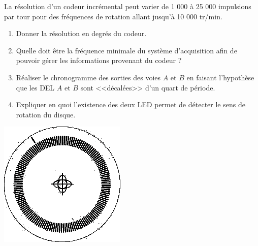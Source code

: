 \documentclass[10pt,fleqn]{article} %
\begin{document}
\begin{exemple}
\begin{minipage}[c]{.75\linewidth}

La résolution d'un codeur incrémental peut varier de 1 000 à 25 000 impulsions par tour pour des fréquences de rotation allant jusqu'à 10 000 tr/min.
\begin{enumerate}
\item Donner la résolution en degrés du codeur. 
\item Quelle doit être la fréquence minimale du système d'acquisition afin de pouvoir gérer les informations provenant du codeur ?
\item Réaliser le chronogramme des sorties des voies $A$ et $B$ en faisant l'hypothèse que les DEL $A$ et $B$ sont <<décalées>> d'un quart de période.
\item Expliquer en quoi l'existence des deux LED permet de détecter le sens de rotation du disque. 
\end{enumerate}
\end{minipage}\hfill
\begin{minipage}[c]{.2\linewidth}
\begin{center}
\includegraphics[width=.95\textwidth]{images/DisqueIncremental}
\end{center}
\end{minipage}


\end{exemple}
\end{document}
